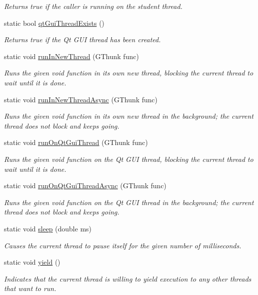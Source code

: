 \begin{DoxyCompactItemize}
\begin{DoxyCompactList}\small\item\em Returns true if the caller is running on the student thread. \end{DoxyCompactList}\item 
static bool \mbox{\hyperlink{classGThread_afee663b5d7998135c2aab0585b2ad37f}{qt\+Gui\+Thread\+Exists}} ()
\begin{DoxyCompactList}\small\item\em Returns true if the Qt G\+UI thread has been created. \end{DoxyCompactList}\item 
static void \mbox{\hyperlink{classGThread_ac9475674a195d39d457307b3e7365ddd}{run\+In\+New\+Thread}} (G\+Thunk func)
\begin{DoxyCompactList}\small\item\em Runs the given void function in its own new thread, blocking the current thread to wait until it is done. \end{DoxyCompactList}\item 
static void \mbox{\hyperlink{classGThread_ad40c76521d01473a3eea90c01000d9e2}{run\+In\+New\+Thread\+Async}} (G\+Thunk func)
\begin{DoxyCompactList}\small\item\em Runs the given void function in its own new thread in the background; the current thread does not block and keeps going. \end{DoxyCompactList}\item 
static void \mbox{\hyperlink{classGThread_a33da0c87717269710ac7a564a1ebbe64}{run\+On\+Qt\+Gui\+Thread}} (G\+Thunk func)
\begin{DoxyCompactList}\small\item\em Runs the given void function on the Qt G\+UI thread, blocking the current thread to wait until it is done. \end{DoxyCompactList}\item 
static void \mbox{\hyperlink{classGThread_a4445680030c65d610b9e348d8d0cffc8}{run\+On\+Qt\+Gui\+Thread\+Async}} (G\+Thunk func)
\begin{DoxyCompactList}\small\item\em Runs the given void function on the Qt G\+UI thread in the background; the current thread does not block and keeps going. \end{DoxyCompactList}\item 
static void \mbox{\hyperlink{classGThread_aa3381590c1ef33c08000c2fbb2bf0dd0}{sleep}} (double ms)
\begin{DoxyCompactList}\small\item\em Causes the current thread to pause itself for the given number of milliseconds. \end{DoxyCompactList}\item 
static void \mbox{\hyperlink{classGThread_a58c8b2ad0ea491a6642e5e1cbd358c89}{yield}} ()
\begin{DoxyCompactList}\small\item\em Indicates that the current thread is willing to yield execution to any other threads that want to run. \end{DoxyCompactList}\end{DoxyCompactItemize}
